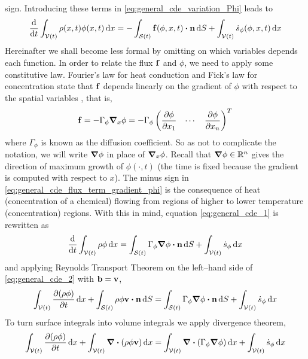 sign. Introducing these terms in \eqref{eq:general_cde_variation_Phi} leads to
\begin{equation} \label{eq:general_cde_1}
	\frac{\dd}{\dd{t}} \int_{\cvt} \rho(x, t) \phi(x, t) \dd{x} = 
	- \int_{\cst} \vb{f}(\phi, x, t) \vdot \vb{n} \dd{S} 
	+ \int_{\cvt} \dot{s}_\phi (\phi, x, t) \dd{x}	
\end{equation}
Hereinafter we shall become less formal by omitting on which variables depends
each function. In order to relate the flux $\vb{f}$ and $\phi$, we need to apply
some constitutive law. Fourier's law for heat conduction and Fick's law for
concentration state that $\vb{f}$ depends linearly on the gradient of $\phi$
with respect to the spatial variables \cite{evans1998heat}, that is,
\begin{equation} \label{eq:general_cde_flux_term_gradient_phi}
	\vb{f} = 
	-\Gamma_\phi \grad_{x} \phi = 
	-\Gamma_\phi
	\begin{pmatrix}
		\displaystyle\pdv{\phi}{x_1} & \cdots & \displaystyle\pdv{\phi}{x_n}
	\end{pmatrix}^T
\end{equation}
where $\Gamma_\phi$ is known as the diffusion coefficient. So as not to
complicate the notation, we will write $\grad{\phi}$ in place of $\grad_{x}
\phi$. Recall that $\grad{\phi} \in \mathbb{R}^n$ gives the direction of maximum
growth of $\phi(\cdot, t)$ (the time is fixed because the gradient is computed
with respect to $x$). The minus sign in
\eqref{eq:general_cde_flux_term_gradient_phi} is the consequence of heat
(concentration of a chemical) flowing from regions of higher to lower
temperature (concentration) regions. With this in mind, equation
\eqref{eq:general_cde_1} is rewritten as
\begin{equation} \label{eq:general_cde_2}
	\frac{\dd}{\dd{t}} \int_{\cvt} \rho \phi \dd{x} = 
	\int_{\cst} \Gamma_\phi \grad{\phi} \vdot \vb{n} \dd{S} +
	\int_{\cvt} \dot{s}_\phi \dd{x}	
\end{equation}
and applying Reynolds Transport Theorem on the left--hand side of
\eqref{eq:general_cde_2} with $\vb{b} = \vb{v}$,
\begin{equation}
	\int_{\cvt} \pdv{(\rho \phi)}{t} \dd{x} + 
	\int_{\cst} \rho \phi \vb{v} \vdot \vb{n} \dd{S} = 
	\int_{\cst} \Gamma_\phi \grad{\phi} \vdot \vb{n} \dd{S} +
	\int_{\cvt} \dot{s}_\phi \dd{x}	
\end{equation}
To turn surface integrals into volume integrals we apply divergence theorem,
\begin{equation}
	\int_{{\mathcal{V}(t)}} \pdv{(\rho \phi)}{t} \dd{x} + 
	\int_{{\mathcal{V}(t)}} \div(\rho \phi \vb{v}) \dd{x} = 
	\int_{{\mathcal{V}(t)}} \div(\Gamma_\phi \grad{\phi}) \dd{x} + 
	\int_{{\mathcal{V}(t)}} \dot{s}_\phi \dd{x}	
\end{equation}
